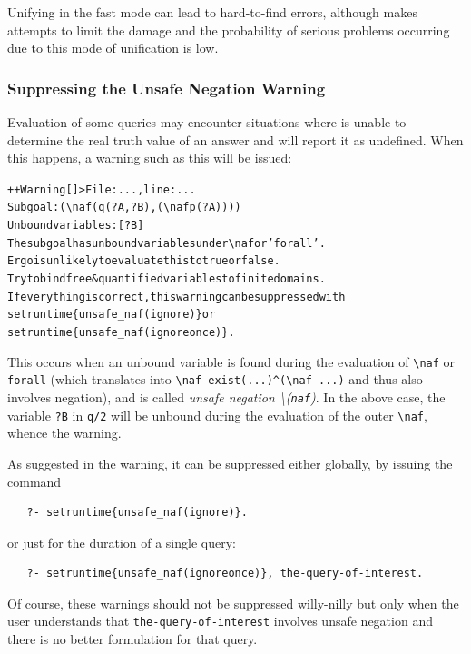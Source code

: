 \documentclass[11pt]{article}
\newcommand{\ERGO}{\mbox{\smaller{\ensuremath{\cal{E}}\smaller{{\sc{RGO}}}}}\xspace}
\newcommand{\FLSYSTEM}{\ERGO}
\newcommand{\bs}{\textbackslash}
\begin{document}
Unifying in the fast mode can lead to hard-to-find errors, although \FLSYSTEM
makes attempts to limit the damage and the probability of serious problems
occurring due to this mode of unification is low.

\subsubsection{Suppressing the Unsafe Negation Warning}
\label{sec-unsafe-naf-suppress}

Evaluation of some queries may encounter situations where \FLSYSTEM is
unable to determine the real truth value of an answer and will report it as
undefined. When this happens, a warning such as this will be issued:
\begin{alltt}
  ++Warning[\FLSYSTEM]> File: ..., line: ...
		   Subgoal: (\bs{}naf (q(?A,?B), (\bs{}naf p(?A))))
		   Unbound variables: [?B]
		   The subgoal has unbound variables under \bs{}naf or 'forall'.
		   Ergo is unlikely to evaluate this to true or false.
		   Try to bind free & quantified variables to finite domains.
		   If everything is correct, this warning can be suppressed with
		      setruntime\{unsafe_naf(ignore)\} or
		      setruntime\{unsafe_naf(ignoreonce)\}.

\end{alltt}
\index{\bs{}naf!unsafe}
\index{unsafe \bs{}naf}
This occurs when an unbound variable is found during the evaluation of
\texttt{\bs{}naf} or \texttt{forall} (which translates into
\verb|\naf exist(...)^(\naf ...)| and thus also involves negation), and is
called \emph{unsafe negation \bs{}(\texttt{naf})}.    
In the above case, the variable \texttt{?B} in \texttt{q/2} will be unbound
during the evaluation of the outer \texttt{\bs{}naf}, whence the warning.   

As suggested in the warning, it can be suppressed either globally, by
issuing the command
\begin{verbatim}
   ?- setruntime{unsafe_naf(ignore)}.
\end{verbatim}
or just for the duration of a single query:
\begin{verbatim}
   ?- setruntime{unsafe_naf(ignoreonce)}, the-query-of-interest.
\end{verbatim}
Of course, these warnings should not be suppressed willy-nilly but only
when the user understands that \texttt{the-query-of-interest} involves
unsafe negation and there is no better formulation for that query. 
\end{document}
